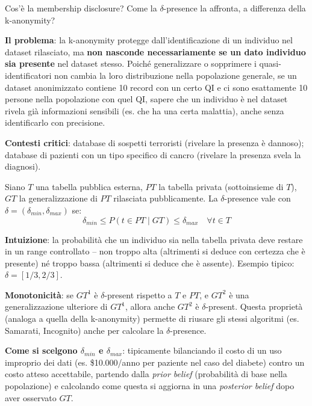 \documentclass[a4paper,11pt]{article}
\begin{document}
\begin{domanda}
Cos'\`{e} la membership disclosure? Come la $\delta$-presence la affronta, a differenza della k-anonymity?
\end{domanda}

\textbf{Il problema}: la k-anonymity protegge dall'identificazione di un individuo nel dataset rilasciato, ma \textbf{non nasconde necessariamente se un dato individuo sia presente} nel dataset stesso. Poich\'{e} generalizzare o sopprimere i quasi-identificatori non cambia la loro distribuzione nella popolazione generale, se un dataset anonimizzato contiene 10 record con un certo QI e ci sono esattamente 10 persone nella popolazione con quel QI, sapere che un individuo \`{e} nel dataset rivela gi\`{a} informazioni sensibili (es. che ha una certa malattia), anche senza identificarlo con precisione.

\textbf{Contesti critici}: database di sospetti terroristi (rivelare la presenza \`{e} dannoso); database di pazienti con un tipo specifico di cancro (rivelare la presenza svela la diagnosi).

\begin{definizione}
Siano $T$ una tabella pubblica esterna, $PT$ la tabella privata (sottoinsieme di $T$), $GT$ la generalizzazione di $PT$ rilasciata pubblicamente. La $\delta$-presence vale con $\delta = (\delta_{min}, \delta_{max})$ se:
\[
\delta_{min} \leq P(t \in PT \mid GT) \leq \delta_{max} \quad \forall t \in T
\]
\end{definizione}

\textbf{Intuizione}: la probabilit\`{a} che un individuo sia nella tabella privata deve restare in un range controllato -- non troppo alta (altrimenti si deduce con certezza che \`{e} presente) n\'{e} troppo bassa (altrimenti si deduce che \`{e} assente). Esempio tipico: $\delta = [1/3, 2/3]$.

\textbf{Monotonicit\`{a}}: se $GT^1$ \`{e} $\delta$-present rispetto a $T$ e $PT$, e $GT^2$ \`{e} una generalizzazione ulteriore di $GT^1$, allora anche $GT^2$ \`{e} $\delta$-present. Questa propriet\`{a} (analoga a quella della k-anonymity) permette di riusare gli stessi algoritmi (es. Samarati, Incognito) anche per calcolare la $\delta$-presence.

\textbf{Come si scelgono $\delta_{min}$ e $\delta_{max}$}: tipicamente bilanciando il costo di un uso improprio dei dati (es. \$10.000/anno per paziente nel caso del diabete) contro un costo atteso accettabile, partendo dalla \emph{prior belief} (probabilit\`{a} di base nella popolazione) e calcolando come questa si aggiorna in una \emph{posterior belief} dopo aver osservato $GT$.
\end{document}
